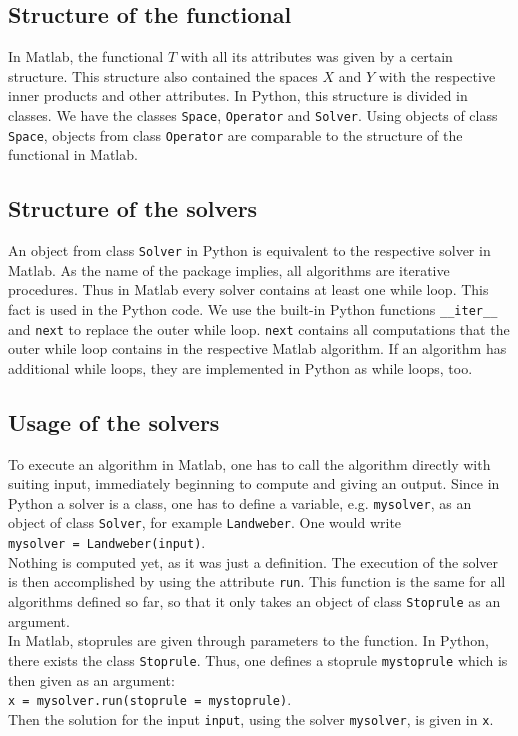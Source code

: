 \documentclass[12pt]{scrartcl}
\begin{document}
\subsection{Structure of the functional}
In Matlab, the functional $T$ with all its attributes was given by a certain structure. This structure also contained the spaces $X$ and $Y$ with the respective inner products and other attributes. In Python, this structure is divided in classes. We have the classes \texttt{Space}, \texttt{Operator} and \texttt{Solver}. Using objects of class \texttt{Space}, objects from class \texttt{Operator} are comparable to the structure of the functional in Matlab.
\subsection{Structure of the solvers}
An object from class \texttt{Solver} in Python is equivalent to the respective solver in Matlab. As the name of the package implies, all algorithms are iterative procedures. Thus in Matlab every solver contains at least one while loop. This fact is used in the Python code. We use the built-in Python functions \texttt{\_\_iter\_\_} and \texttt{next} to replace the outer while loop. \texttt{next} contains all computations that the outer while loop contains in the respective Matlab algorithm. If an algorithm has additional while loops, they are implemented in Python as while loops, too.
\subsection{Usage of the solvers}
To execute an algorithm in Matlab, one has to call the algorithm directly with suiting input, immediately beginning to compute and giving an output. Since in Python a solver is a class, one has to define a variable, e.g. \texttt{mysolver}, as an object of class \texttt{Solver}, for example \texttt{Landweber}. One would write\\
\texttt{mysolver = Landweber(input)}.\\
Nothing is computed yet, as it was just a definition. The execution of the solver is then accomplished by using the attribute \texttt{run}. This function is the same for all algorithms defined so far, so that it only takes an object of class \texttt{Stoprule} as an argument.\\
In Matlab, stoprules are given through parameters to the function. In Python, there exists the class \texttt{Stoprule}. Thus, one defines a stoprule \texttt{mystoprule} which is then given as an argument:\\
\texttt{x = mysolver.run(stoprule = mystoprule)}.\\
Then the solution for the input \texttt{input}, using the solver \texttt{mysolver}, is given in \texttt{x}.
\end{document}
